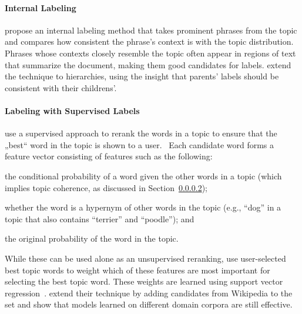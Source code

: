 \paragraph{Internal Labeling}

\citet{mei-07} propose an internal labeling method that takes
prominent phrases from the topic and compares how consistent the
phrase's context is with the topic distribution.  Phrases whose
contexts closely resemble the topic often appear in regions of text
that summarize the document, making them good candidates for labels.
\cite{mao-12} extend the technique to hierarchies, using the insight
that parents’ labels should be consistent with their childrens'.



\paragraph{Labeling with Supervised Labels}


\citet{lau-10} use a supervised approach to rerank the words in a
topic to ensure that the „best“ word in the topic is shown to a
user.  Each candidate word forms a feature vector consisting of
features such as the following:
\begin{itemize*}
\item the conditional probability of a word given the other words in a
  topic (which implies topic coherence, as discussed in Section~\ref{});
\item whether the word is a hypernym of other words in the topic
  (e.g., ``dog'' in a topic that also contains ``terrier'' and
  ``poodle''); and
\item the original probability of the word in the topic.
\end{itemize*}

While these can be used alone as an unsupervised reranking,
\citet{lau-10} use user-selected best topic words to weight which of
these features are most important for selecting the best topic word.
These weights are learned using support vector regression~\cite{}.
\citet{lau-11} extend their technique by adding candidates from
Wikipedia to the set and show that models learned on different domain
corpora are still effective.

